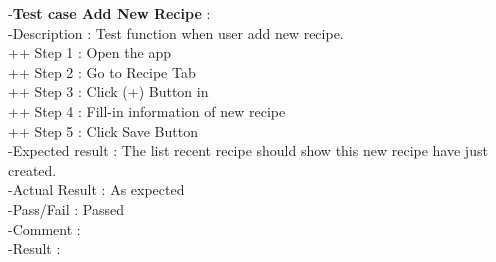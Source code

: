 \documentclass{article}
\begin{document}
   -\textbf{Test case Add New Recipe }: \\
    -Description : Test function when user add new recipe. \\
    ++ Step 1 : Open the app  \\
    ++ Step 2 : Go to Recipe Tab \\
    ++ Step 3 : Click (+) Button in  \\
    ++ Step 4 : Fill-in information of new recipe \\
    ++ Step 5 : Click Save Button \\
    -Expected result : The list recent recipe should show this new recipe have just created. \\
    -Actual Result : As expected \\
    -Pass/Fail : Passed \\
    -Comment :  \\
    -Result : 
\end{document}
